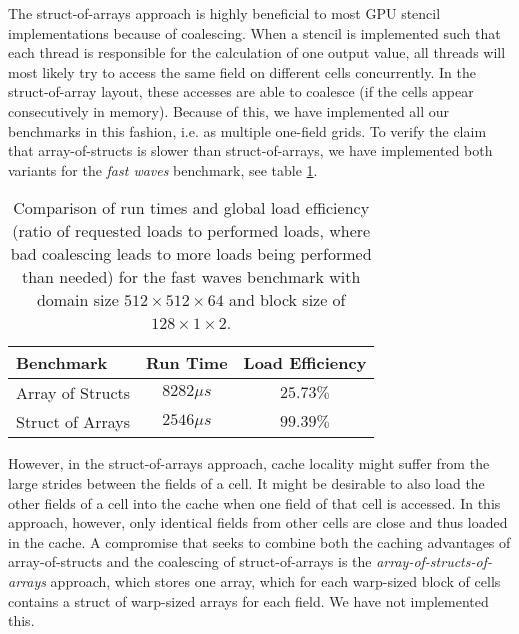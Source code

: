 The struct-of-arrays approach is highly beneficial to most GPU stencil implementations because of coalescing. When a stencil is implemented such that each thread is responsible for the calculation of one output value, all threads will most likely try to access the same field on different cells concurrently. In the struct-of-array layout, these accesses are able to coalesce (if the cells appear consecutively in memory).  Because of this, we have implemented all our benchmarks in this fashion, i.e. as multiple one-field grids. To verify the claim that array-of-structs is slower than struct-of-arrays, we have implemented both variants for the \emph{fast waves} benchmark, see table \ref{tab:array-of-structs}.

\begin{table}
	\begin{center}
    \begin{tabular}{l c c}
        \hline
        \textbf{Benchmark} & \textbf{Run Time} & \textbf{Load Efficiency} \\
        \hline
        \hline
        Array of Structs & $8282 \mu s$ & $25.73\%$\\
        Struct of Arrays & $2546 \mu s$ & $99.39\%$ \\
        \hline
    \end{tabular}
	\end{center}
    \caption{\label{tab:array-of-structs} Comparison of run times and global load efficiency (ratio of requested loads to performed loads, where bad coalescing leads to more loads being performed than needed) for the fast waves benchmark with domain size $512\times 512\times 64$ and block size of $128\times 1\times 2$.}
\end{table}

However, in the struct-of-arrays approach, cache locality might suffer from the large strides between the fields of a cell. It might be desirable to also load the other fields of a cell into the cache when one field of that cell is accessed. In this approach, however, only identical fields from other cells are close and thus loaded in the cache. A compromise that seeks to combine both the caching advantages of array-of-structs and the coalescing of struct-of-arrays is the \emph{array-of-structs-of-arrays} approach, which stores one array, which for each warp-sized block of cells contains a struct of warp-sized arrays for each field. We have not implemented this.
